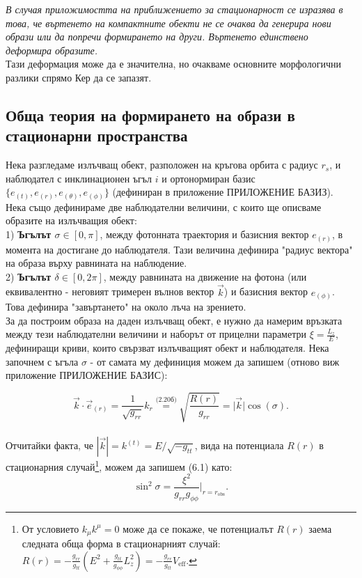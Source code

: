 \emph{В случая приложимостта на приближението за стационарност се изразява в това, че въртенето на компактните обекти не се очаква да генерира нови образи или да попречи формирането на други. Въртенето единствено деформира образите.}\\

Тази деформация може да е значителна, но очакваме основните морфологични разлики спрямо Кер да се запазят.

\subsection{Обща теория на формирането на образи в стационарни пространства}

Нека разгледаме излъчващ обект, разположен на кръгова орбита с радиус $r_s$, и наблюдател с инклинационен ъгъл $i$ и ортонормиран базис $\{e_{(t)}, e_{(r)}, e_{(\theta)}, e_{(\phi)}\}$ (дефиниран в приложение ПРИЛОЖЕНИЕ БАЗИЗ). Нека също дефинираме две наблюдателни величини, с които ще описваме образите на излъчващия обект:\\

1) \textbf{Ъгълът $\sigma\in[0,\pi]$}, между фотонната траектория и базисния вектор $e_{(r)}$, в момента на достигане до наблюдателя. Тази величина дефинира "радиус вектора" на образа върху равнината на наблюдение.\\

2) \textbf{Ъгълът $\delta\in[0,2\pi]$}, между равнината на движение на фотона (или еквивалентно - неговият тримерен вълнов вектор $\vec{k}$) и базисния вектор $e_{(\phi)}$. Това дефинира "завъртането" на около лъча на зрението.\\

За да построим образа на даден излъчващ обект, е нужно да намерим връзката между тези наблюдателни величини и наборът от прицелни параметри $\xi = \frac{L_z}{E}$, дефиниращи криви, които свързват излъчващият обект и наблюдателя. Нека започнем с ъгъла $\sigma$ - от самата му дефиниция можем да запишем (отново виж приложение ПРИЛОЖЕНИЕ БАЗИС):

\begin{equation}
	\vec{k} \cdot \vec{e}_{(r)} = \frac{1}{\sqrt{g_{rr}}}k_{r} \stackrel{\text{(2.20б)}}{=} \sqrt{\frac{R(r)}{g_{rr}}} =  \big\vert \vec{k}\big\vert \cos(\sigma).
\end{equation}\\
Отчитайки факта, че $|\vec{k}| = k^{(t)} = E/\sqrt{-g_{tt}}$,  вида на потенциала $R(r)$ в стационарния случай\footnote{От условието $k_\mu k^\mu = 0$ може да се покаже, че потенциалът $R(r)$ заема следната обща форма в стационарният случай: $R(r) = -\frac{g_{rr}}{g_{tt}}\left(E^2 + \frac{g_{tt}}{g_{\phi\phi}}L_z^2\right) = -\frac{g_{rr}}{g_{tt}} V_\text{eff}$.}, можем да запишем (6.1) като:
\begin{equation}
	\sin^2\sigma = \frac{\xi^2}{g_{rr}g_{\phi\phi}}\bigg\vert_{r = r_\text{obs}}.
\end{equation}

